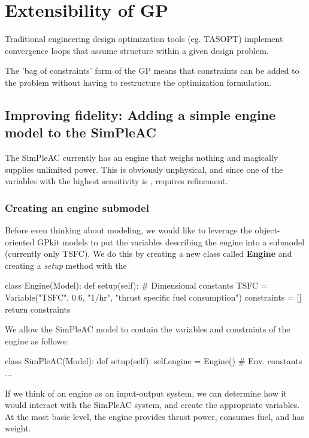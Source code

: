 \chapter{Extensibility of GP}

Traditional engineering design optimization tools (eg. TASOPT) implement convergence loops that assume structure within a given design problem. 

The 'bag of constraints' form of the GP means that constraints can be added to the problem without 
having to restructure the optimization formulation. 

\section{Improving fidelity: Adding a simple engine model to the SimPleAC}
\label{sec:engine}

The SimPleAC currently has an engine that weighs nothing and magically supplies
unlimited power. This is obviously unphysical, and since one of the variables
with the highest sensitivity is \TSFC, requires refinement.

\subsection{Creating an engine submodel}

Before even thinking about modeling, we would like to leverage the object-oriented 
GPkit models to put the variables describing the engine into a submodel (currently only 
TSFC). We do this by creating a new class called \textbf{Engine} and creating a \textit{setup}
method with the 

\begin{python}
class Engine(Model):
    def setup(self):
        # Dimensional constants
        TSFC      = Variable("TSFC", 0.6, "1/hr", "thrust specific fuel consumption")
        constraints = []
        return constraints    
\end{python}

We allow the SimPleAC model to contain the variables and constraints of the engine
as follows:

\begin{python}
class SimPleAC(Model):
    def setup(self):
        self.engine = Engine()
        # Env. constants
        ...
\end{python}

If we think of an engine as an input-output system, we can determine how it
would interact with the SimPleAC system, and create the appropriate variables. 
At the most basic level, the engine provides thrust power, consumes fuel, 
and has weight. 

